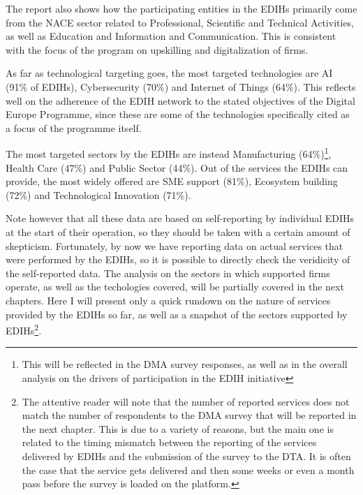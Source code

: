 \documentclass[12pt]{report}
\begin{document}
\par The report also shows how the participating entities in the EDIHs primarily come from the NACE sector related to Professional, Scientific and Technical Activities, as well as Education and Information and Communication. This is consistent with the focus of the program on upskilling and digitalization of firms.

\par As far as technological targeting goes, the most targeted technologies are AI (91\% of EDIHs), Cybersecurity (70\%) and Internet of Things (64\%). This reflects well on the  adherence of the EDIH network to the stated objectives of the Digital Europe Programme, since these are some of the technologies specifically cited as a focus of the programme itself.

\par The most targeted sectors by the EDIHs are instead Manufacturing (64\%)\footnote{This will be reflected in the DMA survey responses, as well as in the overall analysis on the drivers of participation in the EDIH initiative}, Health Care (47\%) and Public Sector (44\%). Out of the services the EDIHs can provide, the most widely offered are SME support (81\%), Ecosystem building (72\%) and Technological Innovation (71\%).

\par Note however that all these data are based on self-reporting by individual EDIHs at the start of their operation, so they should be taken with a certain amount of skepticism. Fortunately, by now we have reporting data on actual services that were performed by the EDIHs, so it is possible to directly check the veridicity of the self-reported data. The analysis on the sectors in which supported firms operate, as well as the techologies covered, will be partially covered in the next chapters. Here I will present only a quick rundown on the nature of services provided by the EDIHs so far, as well as a snapshot of the sectors supported by EDIHs\footnote{The attentive reader will note that the number of reported services does not match the number of respondents to the DMA survey that will be reported in the next chapter. This is due to a variety of reasons, but the main one is related to the timing mismatch between the reporting of the services delivered by EDIHs and the submission of the survey to the DTA. It is often the case that the service gets delivered and then some weeks or even a month pass before the survey is loaded on the platform.}.
\end{document}
